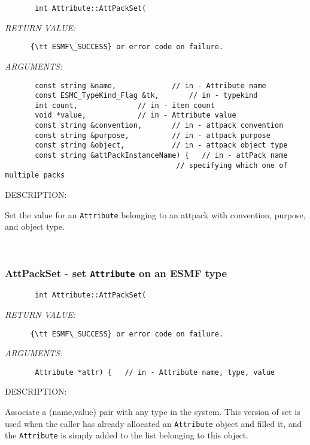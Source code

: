   
\begin{verbatim}       int Attribute::AttPackSet(\end{verbatim}{\em RETURN VALUE:}
\begin{verbatim}      {\tt ESMF\_SUCCESS} or error code on failure.
   \end{verbatim}{\em ARGUMENTS:}
\begin{verbatim}       const string &name,             // in - Attribute name
       const ESMC_TypeKind_Flag &tk,       // in - typekind
       int count,              // in - item count
       void *value,            // in - Attribute value
       const string &convention,       // in - attpack convention
       const string &purpose,          // in - attpack purpose
       const string &object,           // in - attpack object type
       const string &attPackInstanceName) {   // in - attPack name
                                        // specifying which one of multiple packs
   \end{verbatim}
{\sf DESCRIPTION:\\ }


       Set the value for an {\tt Attribute} belonging to an attpack with  
       convention, purpose, and object type.
   
 
\mbox{}\hrulefill\
 
\subsubsection [AttPackSet] {AttPackSet - set {\tt Attribute} on an ESMF type}


  
\begin{verbatim}       int Attribute::AttPackSet(\end{verbatim}{\em RETURN VALUE:}
\begin{verbatim}      {\tt ESMF\_SUCCESS} or error code on failure.
   \end{verbatim}{\em ARGUMENTS:}
\begin{verbatim}       Attribute *attr) {   // in - Attribute name, type, value
   \end{verbatim}
{\sf DESCRIPTION:\\ }


       Associate a (name,value) pair with any type in the system.
       This version of set is used when the caller has already allocated
       an {\tt Attribute} object and filled it, and the {\tt Attribute} 
       is simply added to the list belonging to this object.
   
